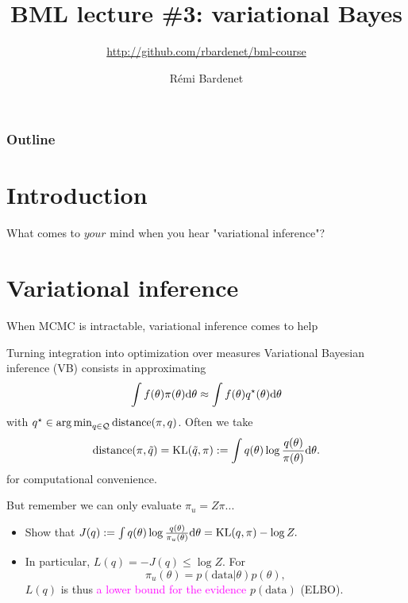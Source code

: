 \documentclass[10pt]{beamer}
\title[Bayesian ML: Bayesics]{BML lecture \#3: variational Bayes}
\subtitle{\url{http://github.com/rbardenet/bml-course}}
\author[Rémi Bardenet (CNRS \& Univ. Lille)] %
{Rémi Bardenet}
\institute[] %
{
  CNRS \& CRIStAL, Univ. Lille, France\\
\vspace{1cm}
\texttt{[image: /Users/rbardenet/Work/Tex/PosterImages/logoCNRS.pdf]}
\qquad \texttt{[image: /Users/rbardenet/Work/Tex/PosterImages/cristalLogo.pdf]}
}
\date{}
\newcommand\un[1]{\textcolor{magenta}{#1}}
\def\blank{\vspace{.5\textheight}}
\begin{document}
\begin{frame}
\maketitle
\end{frame}

\begin{frame}
\frametitle{Outline}
\tableofcontents
\end{frame}

\section{Introduction}

\begin{frame}{What comes to $your$ mind when you hear "variational inference"?}
\end{frame}

\section{Variational inference}
\begin{frame}{When MCMC is intractable, variational inference comes to help}
\begin{block}{Turning integration into optimization over measures}
  Variational Bayesian inference (VB) consists in approximating
  $$ 
    \int f(\theta)\pi(\theta){\rm d}\theta \approx \int f(\theta)q^\star(\theta){\rm d}\theta
  $$
  with \un{$ q^\star \in \operatorname*{arg\,min}_{q\in \mathcal Q} \text{distance}(\pi, q)$}. 
  Often we take
  $$
    \text{distance}(\pi, \tilde q) = \text{KL}(\tilde q, \pi) := \int q(\theta) \log \frac{q(\theta)}{\pi(\theta)}{\rm d}\theta.
  $$
  for computational convenience.
\end{block}
\blank
\end{frame}

\begin{frame}{But remember we can only evaluate $\pi_u = Z\pi$...}
\begin{itemize}
\item Show that $J(q) := \int q(\theta) \log \frac{q(\theta)}{\pi_u(\theta)}{\rm d}\theta = \text{KL}(q, \pi) - \log Z.$
\blank
\item In particular, $L(q) = -J(q) \leq \log Z$. For
$$
\pi_u(\theta) = p(\text{data}\vert\theta) p(\theta),
$$
$L(q)$ is thus \un{a lower bound for the evidence} $p(\text{data})$ (ELBO).
\end{itemize}
\end{frame}
\end{document}
